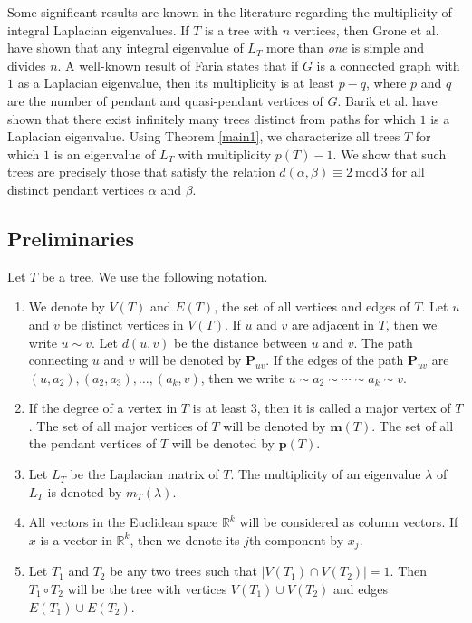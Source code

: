 \documentclass[preprint,12pt]{elsarticle}
\newcommand{\rr}{\mathbb{R}}
\newcommand{\1}{\mathbf{1}}
\newcommand{\0}{\mathbf{0}}
\newcommand{\p}{{\mathbf{P}}}
\def\m{\mathbf{m}}
\def\pt{\mathbf{p}}
\def\p{\mathbf{P}}
\begin{document}
Some significant results are known in the literature
regarding the multiplicity of integral Laplacian eigenvalues.
If $T$ is a tree with $n$ vertices, then
Grone et al. \cite{grone} have shown that any integral eigenvalue of $L_T$ more than {\it one} is simple and divides $n$. 
A well-known result of Faria \cite{faria} states that
if $G$ is a connected graph with $1$ as a Laplacian eigenvalue, then
its multiplicity is at least $p-q$,
where $p$ and $q$ are the number of pendant and quasi-pendant vertices of $G$. 
Barik et al. \cite{barik} have shown that there exist
infinitely many trees distinct from paths for which $1$ is a Laplacian eigenvalue. 
Using Theorem \ref{main1}, we
characterize all trees $T$ for which
$1$ is an eigenvalue of $L_T$ with multiplicity $p(T)-1$. 
We show that such trees are precisely those that satisfy the relation
$d(\alpha,\beta) \equiv 2~\mbox{mod}\,3$ for all distinct pendant vertices
$\alpha$ and $\beta$.

\subsection{Preliminaries}
Let $T$ be a tree. We use the following notation.
\begin{enumerate}
    \item[\rm (i)]  We denote by $V(T)$ and $E(T)$, the set of all vertices and edges of $T$.
Let $u$ and $v$ be distinct vertices in $V(T)$. If $u$ and $v$ are adjacent in $T$, then we write
$u \sim v$. Let $d(u,v)$ be the distance between $u$ and $v$. The path connecting $u$ and $v$
will be denoted by $\p_{uv}$. If the edges of the path $\p_{uv}$ are 
$(u,a_2),(a_2,a_3),\dotsc,(a_k,v)$, then we write $u \sim a_2 \sim \cdots \sim a_k \sim v$.
\item[\rm (ii)] 
If the degree of a vertex in $T$ is at least $3$,
then it is called a major vertex of $T$. The set of all major vertices
of $T$ will be denoted by $\m(T)$. The set of all the pendant vertices
of $T$ will be denoted by $\pt(T)$.
\item[\rm (iii)] 
Let $L_T$ be the Laplacian matrix of $T$. The multiplicity of an eigenvalue 
$\lambda$ of $L_T$ is denoted by
$m_{T}(\lambda)$. 
\item[\rm (iv)] All vectors in the Euclidean space $\rr^k$ will be considered as
column vectors. If $x$ is a vector in $\rr^k$, then we denote its
$j$th component by $x_j$.
\item[\rm (v)] Let $T_1$ and $T_2$ be any two trees such that $|V(T_1)\cap V(T_2)|=1$.
Then $T_1 \circ T_2$ will be the tree with vertices $V(T_1) \cup V(T_2)$
and edges $E(T_1) \cup E(T_2)$. 
\end{enumerate}
\end{document}
